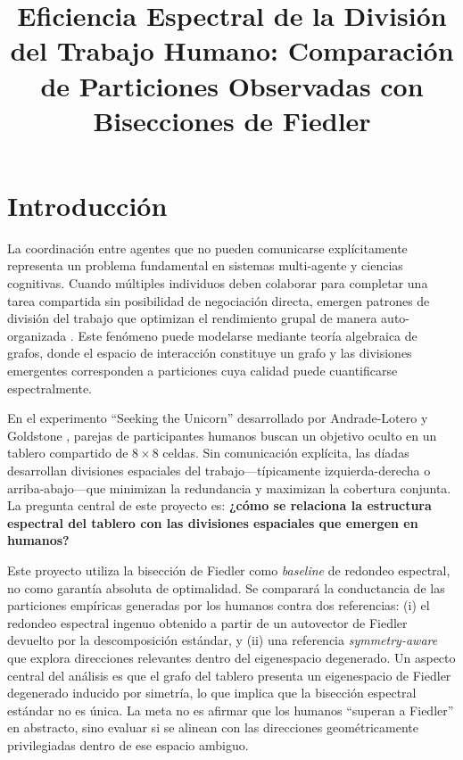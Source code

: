 \documentclass[conference]{IEEEtran}
\begin{document}
\title{Eficiencia Espectral de la División del Trabajo Humano: Comparación de Particiones Observadas con Bisecciones de Fiedler}

\author{
}

\maketitle

\section{Introducción}

La coordinación entre agentes que no pueden comunicarse explícitamente representa un problema fundamental en sistemas multi-agente y ciencias cognitivas. Cuando múltiples individuos deben colaborar para completar una tarea compartida sin posibilidad de negociación directa, emergen patrones de división del trabajo que optimizan el rendimiento grupal de manera auto-organizada \cite{andrade2021}. Este fenómeno puede modelarse mediante teoría algebraica de grafos, donde el espacio de interacción constituye un grafo y las divisiones emergentes corresponden a particiones cuya calidad puede cuantificarse espectralmente.

En el experimento ``Seeking the Unicorn'' desarrollado por Andrade-Lotero y Goldstone \cite{andrade2021}, parejas de participantes humanos buscan un objetivo oculto en un tablero compartido de $8 \times 8$ celdas. Sin comunicación explícita, las díadas desarrollan divisiones espaciales del trabajo---típicamente izquierda-derecha o arriba-abajo---que minimizan la redundancia y maximizan la cobertura conjunta. La pregunta central de este proyecto es: \textbf{¿cómo se relaciona la estructura espectral del tablero con las divisiones espaciales que emergen en humanos?}

Este proyecto utiliza la bisección de Fiedler \cite{fiedler1973} como \textit{baseline} de redondeo espectral, no como garantía absoluta de optimalidad. Se comparará la conductancia de las particiones empíricas generadas por los humanos contra dos referencias: (i) el redondeo espectral ingenuo obtenido a partir de un autovector de Fiedler devuelto por la descomposición estándar, y (ii) una referencia \textit{symmetry-aware} que explora direcciones relevantes dentro del eigenespacio degenerado. Un aspecto central del análisis es que el grafo del tablero presenta un eigenespacio de Fiedler degenerado inducido por simetría, lo que implica que la bisección espectral estándar no es única. La meta no es afirmar que los humanos ``superan a Fiedler'' en abstracto, sino evaluar si se alinean con las direcciones geométricamente privilegiadas dentro de ese espacio ambiguo.
\end{document}
